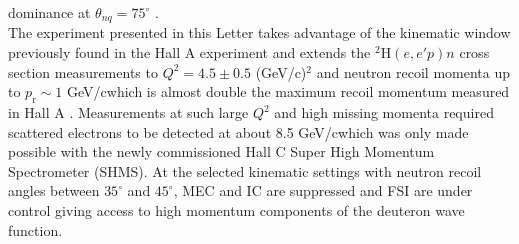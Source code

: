 dominance at $\theta_{nq}=75^{\circ}$ \cite{PhysRevLett.107.262501}. \\
\indent The experiment presented in this Letter takes advantage of the kinematic window previously found in the Hall A experiment \DIFaddbegin {}\DIFaddend and extends the $^{2}\mathrm{H}(e,e'p)n$ cross section measurements
to $Q^{2}=4.5\pm0.5$ (GeV/c)$^{2}$ and neutron recoil momenta up to $p_{\mathrm{r}}\sim 1$ GeV/c\DIFaddbegin \DIFadd{, }\DIFaddend which is almost double \DIFdelbegin {}\DIFdelend the maximum recoil momentum measured in Hall A \cite{PhysRevLett.107.262501}.
Measurements at such large $Q^{2}$ and high missing momenta required scattered electrons to be detected at about 8.5 GeV/c\DIFaddbegin \DIFadd{, }\DIFaddend which was only made possible with the newly commissioned Hall C Super High Momentum Spectrometer (SHMS).
At the selected kinematic settings with neutron recoil angles between $35^{\circ}$ and $45^{\circ}$, MEC and IC are suppressed and FSI are under control giving access to high momentum components of the deuteron wave function.


